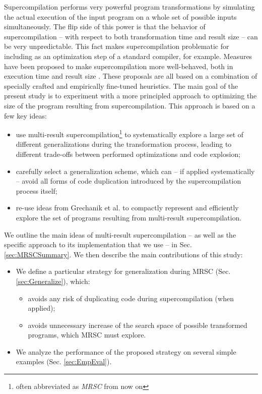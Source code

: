 \documentclass[submission,copyright,creativecommons]{eptcs}
\begin{document}
Supercompilation performs very powerful program transformations by simulating
the actual execution of the input program on a whole set of possible inputs
simultaneously.
The flip side of this power is that the behavior of supercompilation -- 
with respect to both transformation time and result size --
can be very unpredictable.
This fact makes supercompilation problematic for including as an
optimization step of a standard compiler, for example.
Measures have been proposed to make supercompilation more
well-behaved, both in execution time and result size \cite{bolingbroke2011improving,Jonsson2011Taming}.
These proposals are all based on a combination of specially crafted and
empirically fine-tuned heuristics.
The main goal of the present study is to experiment with a more
principled approach to optimizing the size of the program resulting
from supercompilation.
This approach is based on a few key ideas:
\begin{itemize}
  \item use multi-result supercompilation\footnote{often abbreviated as \emph{MRSC} from now on} 
    \cite{KlyuchnikovMRSCBranch,Klyuchnikov:META2012:MRSC,Romanenko2014StagedMRSC}
    to systematically explore a large set of different generalizations during 
    the transformation process, 
    leading to different trade-offs between performed optimizations and code explosion;
  \item carefully select a generalization scheme, which can -- if applied systematically -- avoid all forms of
    code duplication introduced by the supercompilation process itself;
  \item re-use ideas from Grechanik et al. \cite{Romanenko2014StagedMRSC} to compactly represent and efficiently
    explore the set of programs resulting from multi-result supercompilation.
\end{itemize}
We outline the main ideas of multi-result supercompilation --
as well as the specific approach to its implementation that we use --
in Sec. \ref{sec:MRSCSummary}. We then describe the main contributions of this study:
\begin{itemize}
  \item We define a particular strategy for generalization during MRSC (Sec. \ref{sec:Generalize}), which:
    \begin{itemize}
      \item avoids any risk of duplicating code during supercompilation (when applied);
      \item avoids unnecessary increase of the search space of possible
        transformed programs, which MRSC must explore.
    \end{itemize}
  \item We analyze the performance of the proposed strategy on several
    simple examples (Sec. \ref{sec:EmpEval}).
\end{itemize}
\end{document}

